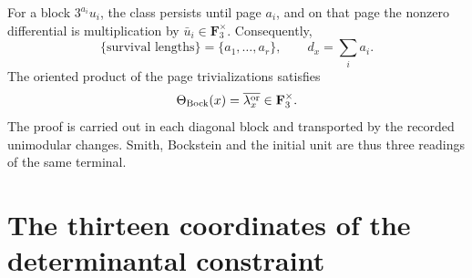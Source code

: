 For a block \(3^{a_i}u_i\), the class persists until page \(a_i\),
and on that page the nonzero differential is multiplication by
\(\bar u_i\in\mathbf F_3^\times\). Consequently,
\begin{equation}\label{eq:detint-bock-longitudes}
 \{\text{survival lengths}\}=\{a_1,\ldots,a_r\},
 \qquad
 d_x=\sum_i a_i.
\end{equation}
The oriented product of the page trivializations satisfies
\begin{equation}\label{eq:detint-bock-leading}
 \Theta_{\rm Bock}(x)=\overline{\lambda_x^{\rm or}}
 \in\mathbf F_3^\times.
\end{equation}
The proof is carried out in each diagonal block and transported by the recorded
unimodular changes. Smith, Bockstein and the initial unit are thus three
readings of the same terminal.

\iffalse
\section{The thirteen coordinates of the determinantal constraint}

